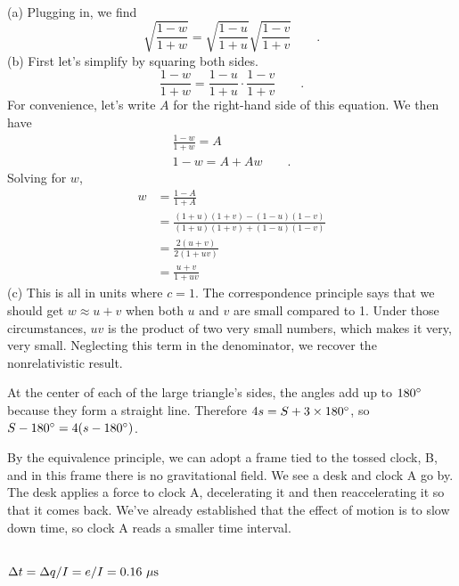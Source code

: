 \noindent{}\\
(a) Plugging in, we find
\begin{equation*}
  \sqrt{\frac{1-w}{1+w}} =   \sqrt{\frac{1-u}{1+u}}   \sqrt{\frac{1-v}{1+v}} \qquad .
\end{equation*}
(b) First let's simplify by squaring both sides.
\begin{equation*}
  \frac{1-w}{1+w} =   \frac{1-u}{1+u}  \cdot \frac{1-v}{1+v} \qquad .
\end{equation*}
For convenience, let's write $A$ for the right-hand side of this equation. We then have
\begin{gather*}
  \frac{1-w}{1+w} = A \\
  1-w = A+Aw \qquad .
\end{gather*}
Solving for $w$,
\begin{align*}
  w &= \frac{1-A}{1+A} \\
    &= \frac{(1+u)(1+v)-(1-u)(1-v)}{(1+u)(1+v)+(1-u)(1-v)} \\
    &= \frac{2(u+v)}{2(1+uv)} \\
    &= \frac{u+v}{1+uv}
\end{align*}
(c) This is all in units where $c=1$. The correspondence principle says that we should get $w\approx u+v$ when
both $u$ and $v$ are small compared to 1. Under those circumstances, $uv$ is the product of two very small
numbers, which makes it very, very small. Neglecting this term in the denominator, we recover the nonrelativistic result.


      At the center of each of the
      large triangle's sides, the angles add up to $180\mspace{0mu}^\circ$ because they form a straight line. Therefore $4s=S+3\times180\mspace{0mu}^\circ$,
      so $S-180\mspace{0mu}^\circ=4(s-180\mspace{0mu}^\circ)$.

By the equivalence principle, we can adopt a frame tied to the tossed clock, B, and in this
frame there is no gravitational field. We see a desk and clock A go by. The desk applies
a force to clock A, decelerating it and then reaccelerating it so that it comes back.
We've already established that the effect of motion is to slow down time, so clock
A reads a smaller time interval.

\noindent{}\\
$\Delta t = \Delta q / I = e/I = 0.16\ \mu \textup{s}$


